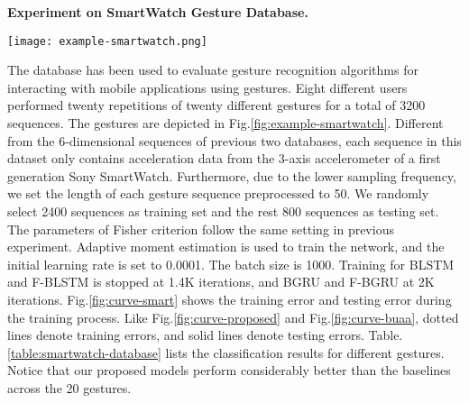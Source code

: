 \documentclass[review]{elsarticle}
\begin{document}
\textbf{Experiment on SmartWatch Gesture Database\;\cite{costante2014eusipco}.}
\begin{figure*}[htbp]
	\normalsize
	\centering
	\texttt{[image: example-smartwatch.png]}
	\\
	\caption{Examples of hand gestures in SmartWatch Database.}
	\label{fig:example-smartwatch}
	\vspace*{4pt}
\end{figure*}
The database has been used to evaluate gesture recognition algorithms for interacting with mobile applications using gestures. Eight different users performed twenty repetitions of twenty different gestures for a total of 3200 sequences. The gestures are depicted in Fig.\;\ref{fig:example-smartwatch}. Different from the 6-dimensional sequences of previous two databases, each sequence in this dataset only contains acceleration data from the 3-axis accelerometer of a first generation Sony SmartWatch. Furthermore, due to the lower sampling frequency, we set the length of each gesture sequence preprocessed to 50. We randomly select 2400 sequences as training set and the rest 800 sequences as testing set. The parameters of Fisher criterion follow the same setting in previous experiment. Adaptive moment estimation is used to train the network, and the initial learning rate  is set to 0.0001. The batch size is 1000. Training for BLSTM and F-BLSTM  is stopped at 1.4K iterations, and BGRU and F-BGRU at 2K iterations. {Fig.\;\ref{fig:curve-smart} shows the training error and testing error during the training process. Like Fig.\;\ref{fig:curve-proposed} and Fig.\;\ref{fig:curve-buaa}, dotted lines denote training errors, and solid lines denote testing errors. Table.\;\ref{table:smartwatch-database} lists the classification results for different gestures. Notice that our proposed models perform considerably better than the baselines across the 20 gestures.}
\end{document}
